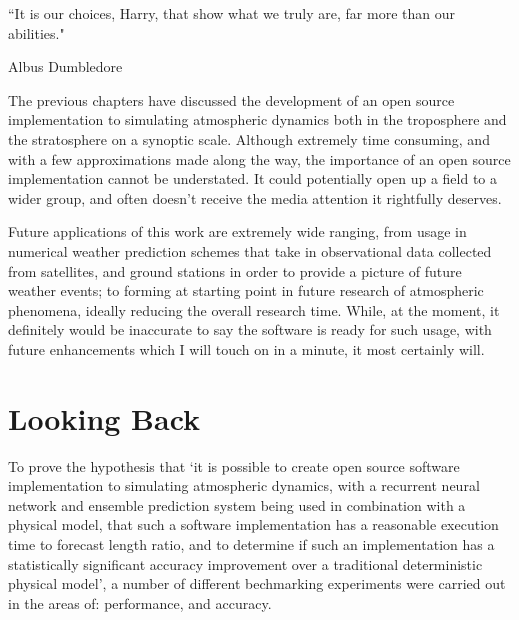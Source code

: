 \epigraph{``It is our choices, Harry, that show what we truly are, far more than our abilities."}{Albus Dumbledore}

The previous chapters have discussed the development of an open source implementation to simulating atmospheric dynamics both in the troposphere and the stratosphere on a synoptic scale. Although extremely time consuming, and with a few approximations made along the way, the importance of an open source implementation cannot be understated. It could potentially open up a field to a wider group, and often doesn't receive the media attention it rightfully deserves. 

Future applications of this work are extremely wide ranging, from usage in numerical weather prediction schemes that take in observational data collected from satellites, and ground stations in order to provide a picture of future weather events; to forming at starting point in future research of atmospheric phenomena, ideally reducing the overall research time. While, at the moment, it definitely would be inaccurate to say the software is ready for such usage, with future enhancements which I will touch on in a minute, it most certainly will.

\section{Looking Back}
To prove the hypothesis that `it is possible to create open source software implementation to simulating atmospheric dynamics, with a recurrent neural network and ensemble prediction system being used in combination with a physical model, that such a software implementation has a reasonable execution time to forecast length ratio, and to determine if such an implementation has a statistically significant accuracy improvement over a traditional deterministic physical model', a number of different bechmarking experiments were carried out in the areas of: performance, and accuracy.

